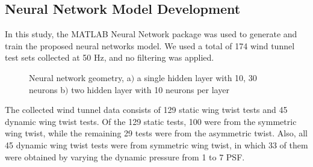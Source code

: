 \documentclass[11pt]{ucthesis}
\begin{document}
\subsection{Neural Network Model Development}
\label{sec:NN}

In this study,  the MATLAB Neural Network package was used to generate and train the proposed neural networks model. We used a total of 174 wind tunnel test sets collected at 50 Hz, and no filtering was applied. 

\begin{figure}[thpb]
\centering
{} 
\caption{Neural network geometry, a$)$ a single hidden layer with 10, 30 neurons b$)$ two hidden layer with 10 neurons per layer}
\label{fig:NNconfig}
\end{figure}

The collected wind tunnel data consists of 129 static wing twist tests and 45 dynamic wing twist tests. Of the 129 static tests, 100 were from the symmetric wing twist, while the remaining 29 tests were from the asymmetric twist. Also, all 45 dynamic wing twist tests were from symmetric wing twist, in which 33 of them were obtained by varying the dynamic pressure from 1 to 7 PSF. 
\end{document}
